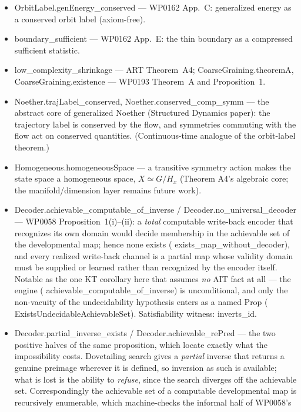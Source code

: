\documentclass[11pt,a4paper]{article}
\newcommand{\lean}[1]{{\ttfamily\small
  \let\leanunderscore\_\def\_{\leanunderscore\allowbreak}#1}}
\begin{document}
\begin{itemize}[leftmargin=1.4em,itemsep=1pt]
argument needs, that the unfolding must be re-chosen as the horizon grows.
\item \lean{OrbitLabel.genEnergy\_conserved} --- WP0162 App.~C: generalized energy as a conserved
orbit label (axiom-free).
\item \lean{boundary\_sufficient} --- WP0162 App.~E: the thin boundary as a compressed sufficient
statistic.
\item \lean{low\_complexity\_shrinkage} --- ART Theorem~A4; \lean{CoarseGraining.theoremA},
\lean{CoarseGraining.existence} --- WP0193 Theorem~A and Proposition~1.
\item \lean{Noether.trajLabel\_conserved}, \lean{Noether.conserved\_comp\_symm} --- the abstract
core of generalized Noether (Structured Dynamics paper): the trajectory label is conserved by the
flow, and symmetries commuting with the flow act on conserved quantities. (Continuous-time analogue
of the orbit-label theorem.)
\item \lean{Homogeneous.homogeneousSpace} --- a transitive symmetry action makes the state space a
homogeneous space, $X \simeq G/H_x$ (Theorem A4's algebraic core; the manifold/dimension layer
remains future work).
\item \lean{Decoder.achievable\_computable\_of\_inverse} / \lean{Decoder.no\_universal\_decoder}
--- WP0058 Proposition~1(i)--(ii): a \emph{total} computable write-back encoder that recognizes its
own domain would decide membership in the achievable set of the developmental map; hence none exists
(\lean{exists\_map\_without\_decoder}), and every realized write-back channel is a partial map whose
validity domain must be supplied or learned rather than recognized by the encoder itself.
Notable as the one KT corollary here that assumes \emph{no} AIT fact at all --- the engine
(\lean{achievable\_computable\_of\_inverse}) is unconditional, and only the non-vacuity of the
undecidability hypothesis enters as a named \lean{Prop}
(\lean{ExistsUndecidableAchievableSet}). Satisfiability witness: \lean{inverts\_id}.
\item \lean{Decoder.partial\_inverse\_exists} / \lean{Decoder.achievable\_rePred} --- the two
positive halves of the same proposition, which locate exactly what the impossibility costs.
Dovetailing search gives a \emph{partial} inverse that returns a genuine preimage wherever it is
defined, so inversion as such is available; what is lost is the ability to \emph{refuse}, since
the search diverges off the achievable set. Correspondingly the achievable set of a computable
developmental map is recursively enumerable, which machine-checks the informal half of WP0058's

\end{itemize}
\end{document}
